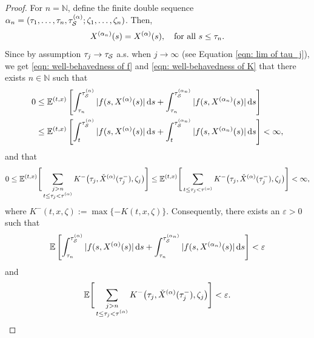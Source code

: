 \begin{proof}
    For $n=\mathbb N$, define the finite double sequence $\alpha_n = (\tau_1, \ldots, \tau_n, \tau_{\mathcal{S}}^{(\alpha)}; \zeta_1, \ldots, \zeta_n)$. Then,
    \begin{equation}
        X^{(\alpha_n)}(s) = X^{(\alpha)}(s), \quad \text{for all } s \leq \tau_n.
        \label{eqn: (10.1.6) in ØS}
    \end{equation}
    Since by assumption $\tau_j \rightarrow \tau_{\mathcal{S}}$ a.s. when $j \rightarrow \infty$ (see Equation \eqref{eqn: lim of tau_j}), we get \eqref{eqn: well-behavedness of f} and \eqref{eqn: well-behavedness of K} that there exists $n \in \mathbb N$ such that 
    \begin{align*}
        0 & \leq \mathbb{E}^{(t,x)} \left[ \int_{\tau_n}^{\tau_{\mathcal{S}}^{(\alpha)}} |f(s,X^{(\alpha)}(s)| \,\mathrm{d} s + \int_{\tau_n}^{\tau_{\mathcal{S}}^{(\alpha_n)}} |f(s,X^{(\alpha_n)}(s)| \,\mathrm{d} s \right] \\ 
        & \leq  \mathbb{E}^{(t,x)} \left[ \int_{t}^{\tau_{\mathcal{S}}^{(\alpha)}} |f(s,X^{(\alpha)}(s)| \,\mathrm{d} s + \int_{t}^{\tau_{\mathcal{S}}^{(\alpha_n)}} |f(s,X^{(\alpha_n)}(s)| \,\mathrm{d} s \right] < \infty,
    \end{align*}
    and that 
    \begin{equation*}
        0 \leq \mathbb{E}^{(t,x)} \Bigg[ \sum_{\substack{j > n \\ t \leq \tau_j < \tau^{(\alpha)}}} K^-\big( \tau_j, \check{X}^{(\alpha)}(\tau_j^-),\zeta_j \big) \Bigg] \leq \mathbb{E}^{(t,x)} \Bigg[ \sum_{t \leq \tau_j < \tau^{(\alpha)}} K^-\big(\tau_j, \check{X}^{(\alpha)}(\tau_j^-),\zeta_j \big) \Bigg] < \infty,
    \end{equation*}
    where $K^-(t,x, \zeta) := \max \{-K(t,x,\zeta)\}$. Consequently, there exists an $\varepsilon > 0$ such that 
    \begin{equation}
        \mathbb{E} \left[ \int_{\tau_n}^{\tau_{\mathcal{S}}^{(\alpha)}} |f(s,X^{(\alpha)}(s)| \,\mathrm{d} s + \int_{\tau_n}^{\tau_{\mathcal{S}}^{(\alpha_n)}} |f(s,X^{(\alpha_n)}(s)| \,\mathrm{d} s \right] < \varepsilon
        \label{eqn: (10.1.7) in ØS}
    \end{equation}
    and
    \begin{equation}
        \mathbb{E} \Bigg[ \sum_{\substack{j > n \\ t \leq \tau_j < \tau^{(\alpha)}}} K^-\big(\tau_j, \check{X}^{(\alpha)}(\tau_j^-),\zeta_j \big) \Bigg] < \varepsilon.
        \label{eqn: (10.1.8) in ØS}
    \end{equation}
    

\end{proof}
